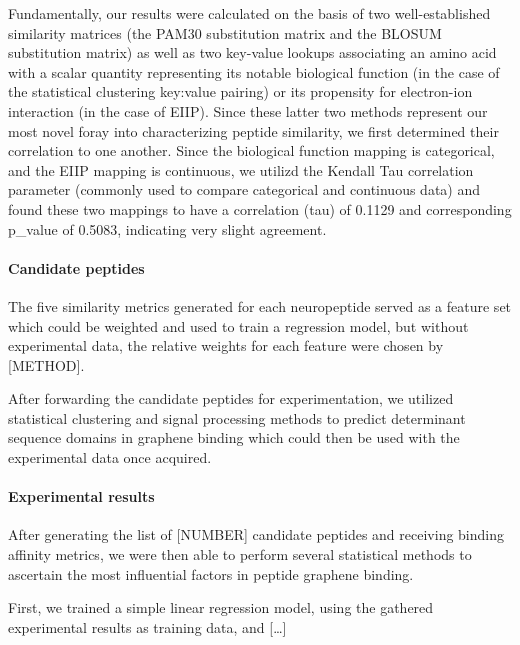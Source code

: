 \documentclass[]{article}
\let\oldparagraph\paragraph
\renewcommand{\paragraph}[1]{\oldparagraph{#1}\mbox{}}
\begin{document}
	Fundamentally, our results were calculated on the basis of two
	well-established similarity matrices (the PAM30 substitution matrix and
	the BLOSUM substitution matrix) as well as two key-value lookups
	associating an amino acid with a scalar quantity representing its
	notable biological function (in the case of the statistical clustering
	key:value pairing) or its propensity for electron-ion interaction (in
	the case of EIIP). Since these latter two methods represent our most
	novel foray into characterizing peptide similarity, we first determined
	their correlation to one another. Since the biological function mapping
	is categorical, and the EIIP mapping is continuous, we utilizd the
	Kendall Tau correlation parameter (commonly used to compare categorical
	and continuous data) and found these two mappings to have a correlation
	(tau) of 0.1129 and corresponding p\_value of 0.5083, indicating very
	slight agreement.
	
	\hypertarget{candidate-peptides}{%
		\paragraph{Candidate peptides}\label{candidate-peptides}}
	
	The five similarity metrics generated for each neuropeptide served as a
	feature set which could be weighted and used to train a regression
	model, but without experimental data, the relative weights for each
	feature were chosen by {[}METHOD{]}.
	
	After forwarding the candidate peptides for experimentation, we utilized
	statistical clustering and signal processing methods to predict
	determinant sequence domains in graphene binding which could then be
	used with the experimental data once acquired.
	
	\hypertarget{experimental-results}{%
		\paragraph{Experimental results}\label{experimental-results}}
	
	After generating the list of {[}NUMBER{]} candidate peptides and
	receiving binding affinity metrics, we were then able to perform several
	statistical methods to ascertain the most influential factors in peptide
	graphene binding.
	
	First, we trained a simple linear regression model, using the gathered
	experimental results as training data, and {[}\ldots{}{]}
	
\end{document}
